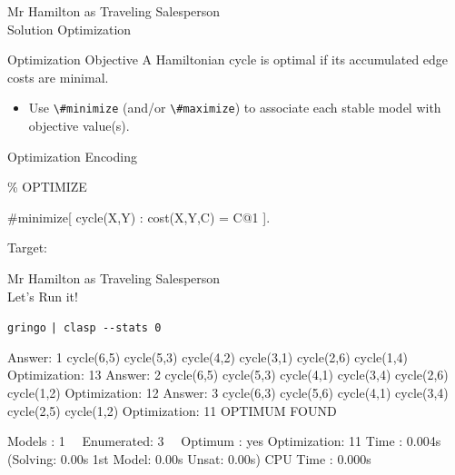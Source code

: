 \begin{frame}{Mr Hamilton as Traveling Salesperson\\
  \normalsize Solution \alert{Optimization}}
  \begin{block}{Optimization Objective}
  A Hamiltonian cycle is optimal if
  its accumulated edge costs are \alert<1>{minimal}.
  \end{block}
  \begin{itemize}
  \item[\ithand] Use \alert<1>{\lstinline{\#minimize}} (and/or \alert<1>{\lstinline{\#maximize}})
                 to associate each stable model with objective value(s).
  \end{itemize}
\pause
  \begin{block}{Optimization Encoding}
  \vspace*{-2mm}
  \begin{semiverbatim}
  \% OPTIMIZE

  \alert<2>{\#minimize}[ \alert<6>{cycle(X,Y)} \alert<5>{: cost(X,Y,C)} \alert<3>{= C}\alert<4>{@1} ].
  \end{semiverbatim}
  \vspace{-2mm}
  \begin{description}
  \item[Target:] 
  \end{description}
  \end{block}
\end{frame}
\begin{frame}[fragile]{Mr Hamilton as Traveling Salesperson\\
              \normalsize Let's \alert{Run} it!}
\begin{block}{\alert<1>{\lstinline{gringo}     \lstinline{| clasp --stats 0}}}
\vspace*{-4mm}
\pause\scriptsize%
\begin{semiverbatim}
Answer: 1
cycle(6,5) cycle(5,3) cycle(4,2) cycle(3,1) cycle(2,6) cycle(1,4)
\alert{Optimization: 13}
Answer: 2
cycle(6,5) cycle(5,3) cycle(4,1) cycle(3,4) cycle(2,6) cycle(1,2)
\alert{Optimization: 12}
Answer: 3
cycle(6,3) cycle(5,6) cycle(4,1) cycle(3,4) cycle(2,5) cycle(1,2)
\alert{Optimization: 11}
\alert{OPTIMUM FOUND}

\alert{Models      : 1}
\ \ \alert{Enumerated: 3}
\ \ \alert{Optimum   : yes}
\alert{Optimization: 11}
Time        : 0.004s (Solving: 0.00s 1st Model: 0.00s Unsat: 0.00s)
CPU Time    : 0.000s
\end{semiverbatim}
\end{block}
\end{frame}
